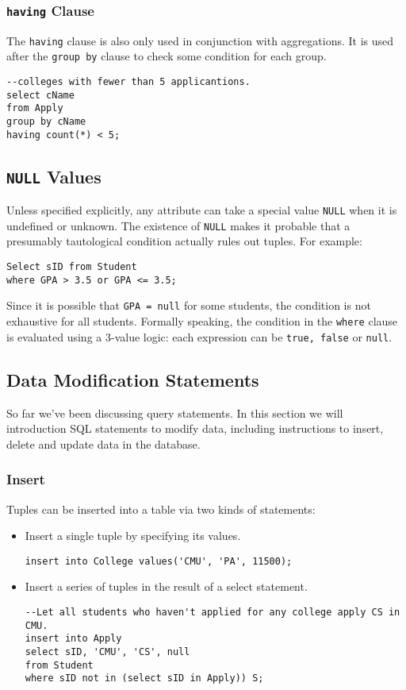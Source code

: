\subsubsection{\texttt{having} Clause}
The \texttt{having} clause is also only used in conjunction with aggregations. It is used after the \texttt{group by} clause to check some condition for each group.
\begin{lstlisting}
--colleges with fewer than 5 applicantions.
select cName
from Apply
group by cName
having count(*) < 5;
\end{lstlisting}
\subsection{\texttt{NULL} Values}
Unless specified explicitly, any attribute can take a special value \texttt{NULL} when it is undefined or unknown. The existence of \texttt{NULL} makes it probable that a presumably tautological condition actually rules out tuples. For example:
\begin{lstlisting}
Select sID from Student
where GPA > 3.5 or GPA <= 3.5;
\end{lstlisting} 
Since it is possible that \texttt{GPA = null} for some students, the condition is not exhaustive for all students. Formally speaking, the condition in the \texttt{where} clause is evaluated using a 3-value logic: each expression can be \texttt{true, false} or \texttt{null}.
\subsection{Data Modification Statements}
So far we've been discussing query statements. In this section we will introduction SQL statements to modify data, including instructions to insert, delete and update data in the database. 
\subsubsection{Insert}
Tuples can be inserted into a table via two kinds of statements:
\begin{itemize}
\item Insert a single tuple by specifying its values.
\begin{lstlisting}
insert into College values('CMU', 'PA', 11500);
\end{lstlisting} 
\item Insert a series of tuples in the result of a select statement.
\begin{lstlisting}
--Let all students who haven't applied for any college apply CS in CMU.
insert into Apply
select sID, 'CMU', 'CS', null
from Student
where sID not in (select sID in Apply)) S;
\end{lstlisting} 
\end{itemize}
